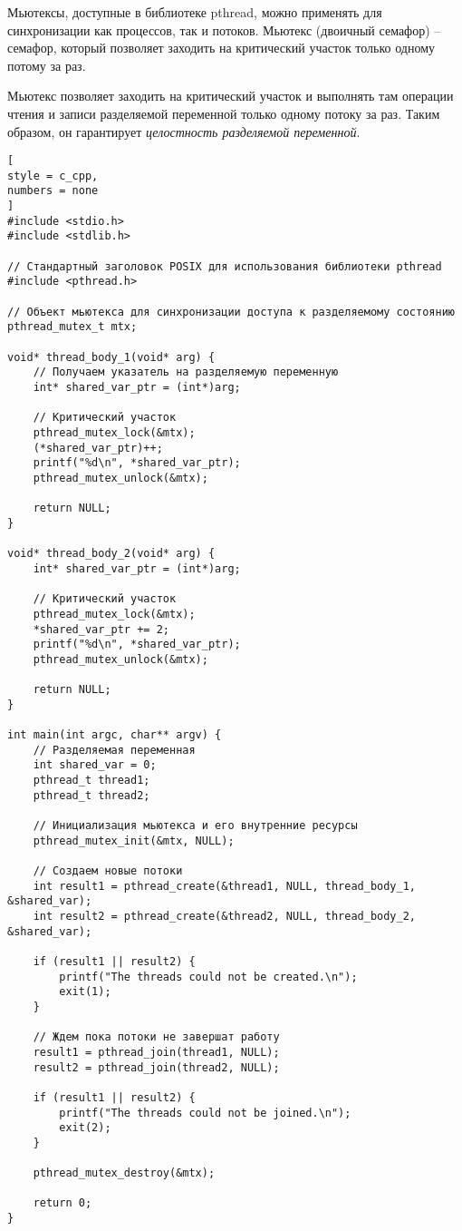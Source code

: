 \documentclass[%
	11pt,
	a4paper,
	utf8,
		]{article}
\begin{document}
Мьютексы, доступные в библиотеке pthread, можно применять для синхронизации как процессов, так и потоков. Мьютекс (двоичный семафор) -- семафор, который позволяет заходить на критический участок только одному потому за раз.

Мьютекс позволяет заходить на критический участок и выполнять там операции чтения и записи разделяемой переменной только одному потоку за раз. Таким образом, он гарантирует \emph{целостность разделяемой переменной}.

\begin{lstlisting}[
style = c_cpp,
numbers = none
]
#include <stdio.h>
#include <stdlib.h>

// Стандартный заголовок POSIX для использования библиотеки pthread
#include <pthread.h>

// Объект мьютекса для синхронизации доступа к разделяемому состоянию
pthread_mutex_t mtx;

void* thread_body_1(void* arg) {
    // Получаем указатель на разделяемую переменную
    int* shared_var_ptr = (int*)arg;
    
    // Критический участок
    pthread_mutex_lock(&mtx);
    (*shared_var_ptr)++;
    printf("%d\n", *shared_var_ptr);
    pthread_mutex_unlock(&mtx);
    
    return NULL;
}

void* thread_body_2(void* arg) {
    int* shared_var_ptr = (int*)arg;
    
    // Критический участок
    pthread_mutex_lock(&mtx);
    *shared_var_ptr += 2;
    printf("%d\n", *shared_var_ptr);
    pthread_mutex_unlock(&mtx);
    
    return NULL;
}

int main(int argc, char** argv) {
    // Разделяемая переменная
    int shared_var = 0;
    pthread_t thread1;
    pthread_t thread2;
    
    // Инициализация мьютекса и его внутренние ресурсы
    pthread_mutex_init(&mtx, NULL);
    
    // Создаем новые потоки
    int result1 = pthread_create(&thread1, NULL, thread_body_1, &shared_var);
    int result2 = pthread_create(&thread2, NULL, thread_body_2, &shared_var);
    
    if (result1 || result2) {
        printf("The threads could not be created.\n");
        exit(1);
    }
    
    // Ждем пока потоки не завершат работу
    result1 = pthread_join(thread1, NULL);
    result2 = pthread_join(thread2, NULL);
    
    if (result1 || result2) {
        printf("The threads could not be joined.\n");
        exit(2);
    }
    
    pthread_mutex_destroy(&mtx);
    
    return 0;
}
\end{lstlisting}
\end{document}
